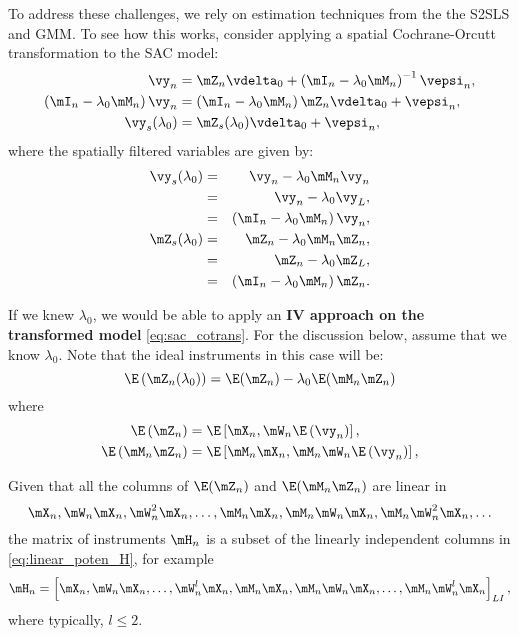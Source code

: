 To address these challenges, we rely on estimation techniques from the the S2SLS and GMM. To see how this works, consider applying a spatial Cochrane-Orcutt transformation to the SAC model: 
\begin{equation}\label{eq:sac_cotrans}
	\begin{aligned}
	\vy_n & = \mZ_n\vdelta_0 + \left(\mI_n - \lambda_0\mM_n\right)^{-1}\vepsi_n, \\
	\left(\mI_n - \lambda_0 \mM_n\right)\vy_n & = \left(\mI_n - \lambda_0 \mM_n\right) \mZ_n\vdelta_0 + \vepsi_n, \\
	\vy_s(\lambda_0) & = \mZ_s(\lambda_0)\vdelta_0 + \vepsi_n, 
	\end{aligned}
\end{equation}
%
where the spatially filtered variables are given by:
\begin{eqnarray*}
\vy_s(\lambda_0) & = & \vy_n - \lambda_0 \mM_n\vy_n \\
      & = & \vy_n - \lambda_0 \vy_L, \\
      & = & \left(\mI_n - \lambda_0 \mM_n\right)\vy_n, \\
\mZ_s(\lambda_0) & = & \mZ_n - \lambda_0 \mM_n \mZ_n, \\
      & = & \mZ_n - \lambda_0 \mZ_L, \\
      & = & \left(\mI_n - \lambda_0 \mM_n\right) \mZ_n. \\
\end{eqnarray*}

If we knew $\lambda_0$, we would be able to apply an \textbf{IV approach on the transformed model} \eqref{eq:sac_cotrans}. For the discussion below, assume that we know $\lambda_0$. Note that the ideal instruments in this case will be:
\begin{equation*}
\E\left(\mZ_n(\lambda_0)\right) = \E(\mZ_n) -\lambda_0\E(\mM_n\mZ_n)
\end{equation*}
%
where
\begin{equation*}
  \begin{aligned}
    \E\left(\mZ_n\right)    & = \E\left[\mX_n, \mW_n\E\left(\vy_n\right)\right], \\
    \E\left(\mM_n\mZ_n\right) & = \E\left[\mM_n\mX_n, \mM_n\mW_n\E\left(\vy_n\right)\right],
  \end{aligned}
\end{equation*}

Given that all the columns of $\E(\mZ_n)$ and $\E(\mM_n\mZ_n)$ are linear in
\begin{equation}\label{eq:linear_poten_H}
  \mX_n, \mW_n\mX_n, \mW^2_n\mX_n, \ldots, \mM_n\mX_n, \mM_n\mW_n\mX_n, \mM_n\mW^2_n\mX_n, \ldots
\end{equation}
%
the matrix of instruments $\mH_n$ is a subset of the linearly independent columns in \eqref{eq:linear_poten_H}, for example
\begin{equation*}
  \mH_n = \left[\mX_n, \mW_n\mX_n, \ldots, \mW^l_n\mX_n, \mM_n\mX_n, \mM_n\mW_n\mX_n, \ldots,\mM_n\mW^l_n\mX_n\right]_{LI},
\end{equation*}
%
where typically, $l\leq 2$. 

